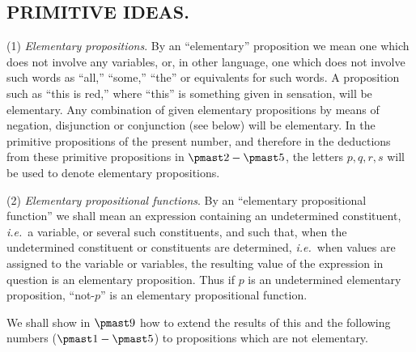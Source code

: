 \subsection*{\centering PRIMITIVE IDEAS.} 
(1) \textit{Elementary propositions}. By an ``elementary'' proposition we mean one which does not involve any variables, or, in other language, one which does not involve such words as ``all,'' ``some,'' ``the'' or equivalents for such words. A proposition such as ``this is red,'' where ``this'' is something given  in sensation, will be elementary. Any combination of given elementary propositions by means of negation, disjunction or conjunction (see below) will  be elementary. In the primitive propositions of the present number, and therefore in the deductions from these primitive propositions in $\pmast2-\pmast5$, the letters $p, q, r, s$ will be used to denote elementary propositions.

(2) \textit{Elementary propositional functions}. By an ``elementary propositional function'' we shall mean an expression containing an undetermined constituent, \textit{i.e.}\ a variable, or several such constituents, and such that, when the undetermined constituent or constituents are determined, \textit{i.e.}\ when values are assigned to the variable or variables, the resulting value of the expression in question is an elementary proposition. Thus if $p$ is an undetermined elementary proposition, ``not-$p$'' is an elementary propositional function.

We shall show in $\pmast9$ how to extend the results of this and the following numbers ($\pmast1-\pmast5$) to propositions which are not elementary.

